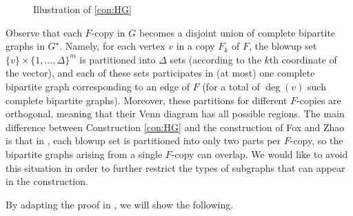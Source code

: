 \documentclass[reqno, english, 12pt]{amsart}
\theoremstyle{plain}
\theoremstyle{remark}
\begin{document}
\begin{figure}[ht]
\begin{center}
\end{center}
\caption{Illustration of \cref{con:HG}}\label{fig:construction}
\end{figure}

Observe that each $F$-copy in $G$ becomes a disjoint union of complete bipartite graphs in $G^{\star}$. 
Namely, for each vertex $v$ in a copy $F_k$ of $F$, the blowup set 
$\{v\} \times \{1,\dots,\Delta\}^m$ is partitioned into $\Delta$ sets (according to the $k$th coordinate of the vector), and each of these sets participates in (at most) one complete bipartite graph corresponding to an edge of $F$ (for a total of $\deg(v)$ such complete bipartite graphs). Moreover, these partitions for different $F$-copies are orthogonal, meaning that their Venn diagram has all possible regions.  
The main difference between Construction \ref{con:HG} and the construction of Fox and Zhao \cite{FZ} is that in \cite{FZ}, each blowup set is partitioned into only two parts per $F$-copy, so the bipartite graphs arising from a single $F$-copy can overlap. We would like to avoid this situation in order to further restrict the types of subgraphs that can appear in the construction. 


By adapting the proof in \cite{FZ}, we will show the following. 
\end{document}
